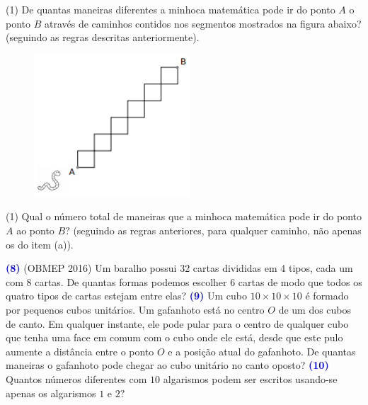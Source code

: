 \documentclass[12pt, a4paper]{article}
\newcommand{\negrito}[1]{\mbox{\boldmath{$#1$}}}
\begin{document}
\begin{tasks}[counter-format={(tsk[a])},label-width=3.6ex, label-format = {\bfseries}, column-sep = {0pt}](1)
\task[\textcolor{Floresta}{$\negrito{(a)} $}] De quantas maneiras diferentes a minhoca matemática pode ir do ponto $A$ o ponto $B$ através de caminhos contidos nos segmentos mostrados na figura abaixo? (seguindo as regras descritas anteriormente).
\end{tasks}
\begin{figure}[!h]
    \centering
    \includegraphics{Figuras/q73c2e1.png}
\end{figure}
\begin{tasks}[counter-format={(tsk[a])},label-width=3.6ex, label-format = {\bfseries}, column-sep = {0pt}](1)
\task[\textcolor{Floresta}{$\negrito{(b)} $}] Qual o número total de maneiras que a minhoca matemática pode ir do ponto $A$ ao
ponto $B?$ (seguindo as regras anteriores, para qualquer caminho, não apenas os do item (a)).
\end{tasks}
\textcolor{blue}{\bf(8)} (OBMEP 2016) Um baralho possui 32 cartas divididas em 4 tipos, cada um com 8 cartas. De quantas formas podemos escolher 6 cartas de modo que todos os quatro tipos de cartas estejam entre elas?
\newline
\newline
\textcolor{blue}{\bf(9)} Um cubo $10 \times 10 \times 10$ é formado por pequenos cubos unitários. Um gafanhoto está no centro $O$ de um dos cubos de canto. Em qualquer instante, ele pode pular para o centro de qualquer cubo que tenha uma face em comum com o cubo onde ele está, desde que este pulo aumente a distância entre o ponto $O$ e a posição atual do gafanhoto. De quantas maneiras o gafanhoto pode chegar ao cubo unitário no canto oposto?
\newline
\newline
\textcolor{blue}{\bf(10)} Quantos números diferentes com $10$ algarismos podem ser escritos usando-se apenas os algarismos $1$ e $2?$
\newline
\end{document}
